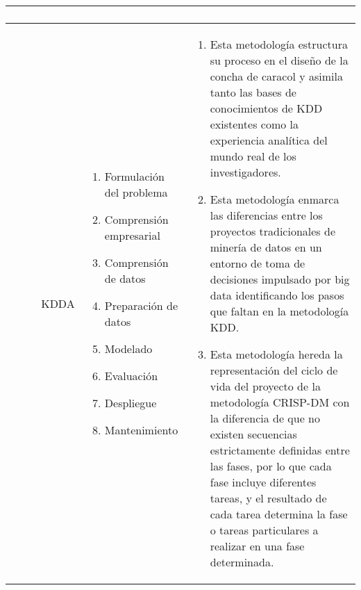 \begin{table*}
\begin{threeparttable}
\begin{tabular}{ p{2cm} p{4cm} p{5cm} p{6cm}  }
\begin{enumerate}
			\end{enumerate}
			\\ \hline
			\citep{Li2016}
			& KDDA
			&  \begin{enumerate}
				\item Formulación del problema
				\item Comprensión empresarial
				\item Comprensión de datos
				\item Preparación de datos
				\item Modelado
				\item Evaluación
				\item Despliegue 
				\item Mantenimiento
			\end{enumerate}
			& \begin{enumerate}
			\item Esta metodología estructura su proceso en el diseño de la concha de caracol y asimila tanto las bases de conocimientos de KDD existentes como la experiencia analítica del mundo real de los investigadores. 
			\item Esta metodología enmarca las diferencias entre los proyectos tradicionales de minería de datos en un entorno de toma de decisiones impulsado por big data identificando los pasos que faltan en la metodología KDD.
			\item Esta metodología hereda la representación del ciclo de vida del proyecto de la metodología CRISP-DM con la diferencia de que no existen  secuencias estrictamente definidas entre las fases, por lo que cada fase incluye diferentes tareas, y el resultado de cada tarea determina la fase o tareas particulares a realizar en una fase determinada. 
			\end{enumerate}
			\\ \hline
	
		\end{tabular}
	\end{threeparttable}
\end{table*}

